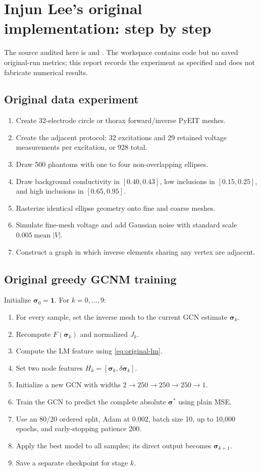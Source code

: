 \documentclass[11pt]{article}
\newcommand{\sig}{\bm{\sigma}}
\begin{document}
\section{Injun Lee's original implementation: step by step}

The source audited here is  and
.  The workspace contains code but no saved original-run
metrics; this report records the experiment as specified and does not fabricate
numerical results.

\subsection{Original data experiment}

\begin{enumerate}[label=\textbf{O\arabic*.},leftmargin=2.5em]
\item Create 32-electrode circle or thorax forward/inverse PyEIT meshes.
\item Create the adjacent protocol: 32 excitations and 29 retained voltage
measurements per excitation, or 928 total.
\item Draw 500 phantoms with one to four non-overlapping ellipses.
\item Draw background conductivity in $[0.40,0.43]$, low inclusions in
$[0.15,0.25]$, and high inclusions in $[0.65,0.95]$.
\item Rasterize identical ellipse geometry onto fine and coarse meshes.
\item Simulate fine-mesh voltage and add Gaussian noise with standard scale
$0.005\operatorname{mean}|V|$.
\item Construct a graph in which inverse elements sharing any vertex are adjacent.
\end{enumerate}

\subsection{Original greedy GCNM training}

Initialize $\sig_0=\bm1$.  For $k=0,\ldots,9$:
\begin{enumerate}[label=\textbf{G\arabic*.},leftmargin=2.5em]
\item For every sample, set the inverse mesh to the current GCN estimate $\sig_k$.
\item Recompute $F(\sig_k)$ and normalized $J_k$.
\item Compute the LM feature using \cref{eq:original-lm}.
\item Set two node features $H_k=[\sig_k,\delta\sig_k]$.
\item Initialize a new GCN with widths $2\to250\to250\to250\to1$.
\item Train the GCN to predict the complete absolute $\sig^*$ using plain MSE.
\item Use an 80/20 ordered split, Adam at $0.002$, batch size 10, up to 10,000
epochs, and early-stopping patience 200.
\item Apply the best model to all samples; its direct output becomes $\sig_{k+1}$.
\item Save a separate checkpoint for stage $k$.
\end{enumerate}
\end{document}
